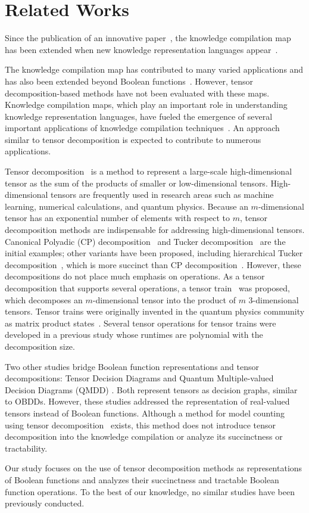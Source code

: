\section{Related Works}
Since the publication of an innovative paper~\cite{knowledge}, the knowledge compilation map has been extended when new knowledge representation languages appear~\cite{kcmap_extension1,darwiche_2014}.

The knowledge compilation map has contributed to many varied applications and has also been extended beyond Boolean functions~\cite{FargierMN13,choi2020probabilistic}. However, tensor decomposition-based methods have not been evaluated with these maps.
Knowledge compilation maps, which play an important role in understanding knowledge representation languages, have fueled the emergence of several important applications of knowledge compilation techniques~\cite{CHAVIRA2008772,NEURIPS2018_dc5d637e,pmlr-v80-xu18h}.
An approach similar to tensor decomposition is expected to contribute to numerous applications.

Tensor decomposition~\cite{kolda09} is a method to represent a large-scale high-dimensional tensor as the sum of the products of smaller or low-dimensional tensors.
High-dimensional tensors are frequently used in research areas such as machine learning, numerical calculations, and quantum physics. Because an $m$-dimensional tensor has an exponential number of elements with respect to $m$, tensor decomposition methods are indispensable for addressing high-dimensional tensors.
Canonical Polyadic (CP) decomposition~\cite{carroll70} and Tucker decomposition~\cite{tucker66} are the initial examples; other variants have been proposed, including hierarchical Tucker decomposition~\cite{hackbusck09}, which is more succinct than CP decomposition~\cite{khrulkov2018expressive}.
However, these decompositions do not place much emphasis on operations.
As a tensor decomposition that supports several operations, a tensor train~\cite{oseledets2011tensor} was proposed, which decomposes an $m$-dimensional tensor into the product of $m$ 3-dimensional tensors.
Tensor trains were originally invented in the quantum physics community as matrix product states~\cite{fannes92}. Several tensor operations for tensor trains were developed in a previous study whose runtimes are polynomial with the decomposition size\cite{oseledets2011tensor}.

Two other studies bridge Boolean function representations and tensor decompositions: Tensor Decision Diagrams \cite{hong2022tensor} and {Quantum Multiple-valued Decision Diagrams} (QMDD) \cite{niemann2015qmdds}.
Both represent tensors as decision graphs, similar to OBDDs.
However, these studies addressed the representation of real-valued tensors instead of Boolean functions.
Although a method for model counting using tensor decomposition~\cite{dudek2020parallel} exists, this method does not introduce tensor decomposition into the knowledge compilation or analyze its succinctness or tractability.

Our study focuses on the use of tensor decomposition methods as representations of Boolean functions and analyzes their succinctness and tractable Boolean function operations.
To the best of our knowledge, no similar studies have been previously conducted.